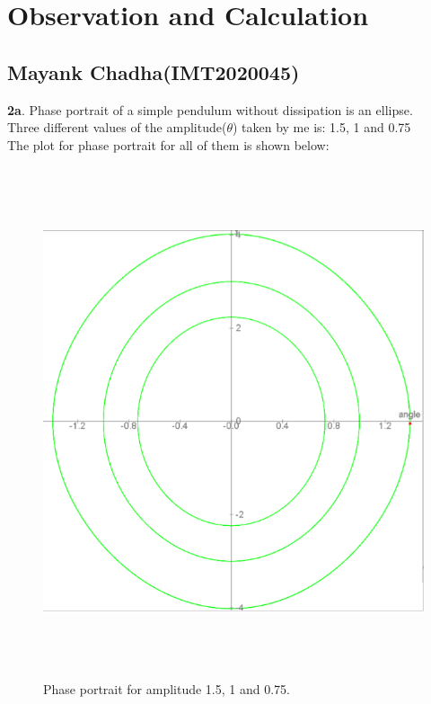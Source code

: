 \documentclass[11pt]{scrartcl} %
\begin{document}
\section{Observation and Calculation}
\subsection{Mayank Chadha(IMT2020045)}

\textbf{2a}.
Phase portrait of a simple pendulum without dissipation is an ellipse.\\
Three different values of the amplitude($\theta$) taken by me is: 1.5, 1 and 0.75\\

The plot for phase portrait for all of them is shown below:

\begin{figure}[h] %
	\centering
	\includegraphics[width=\textwidth, height=15cm]{Figures/M 2a.png} %
	\caption{Phase portrait for amplitude 1.5, 1 and 0.75.}
\end{figure}
\end{document}
